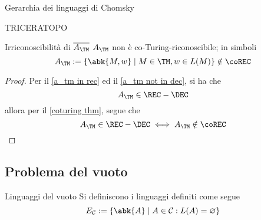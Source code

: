 \documentclass[a4paper, 12pt]{report}
\begin{document}
    \begin{framedobs}{Gerarchia dei linguaggi di Chomsky}
        \begin{center}
        \end{center}

        TRICERATOPO
    \end{framedobs}

    \begin{framedcor}[label={a_tm not in corec}]{Irriconoscibilità di $\overline{A_\TM}$}
        $A_\TM$ non è co-Turing-riconoscibile; in simboli $$A_\TM := \{\abk{M, w} \mid M \in \TM, w \in L(M)\} \notin \coREC$$
    \end{framedcor}

    \begin{proof}
        Per il \cref{a_tm in rec} ed il \cref{a_tm not in dec}, si ha che $$A_\TM \in \REC - \DEC$$ allora per il \cref{coturing thm}, segue che $$A_\TM \in \REC - \DEC \iff A_\TM \notin \coREC$$
    \end{proof}

    \subsection{Problema del vuoto}

    \begin{frameddefn}{Linguaggi del vuoto}
        Si definiscono  i linguaggi definiti come segue $$E_\mathcal{C} := \{\abk{A} \mid A \in \mathcal{C}: L(A) = \varnothing\}$$
    \end{frameddefn}
\end{document}
